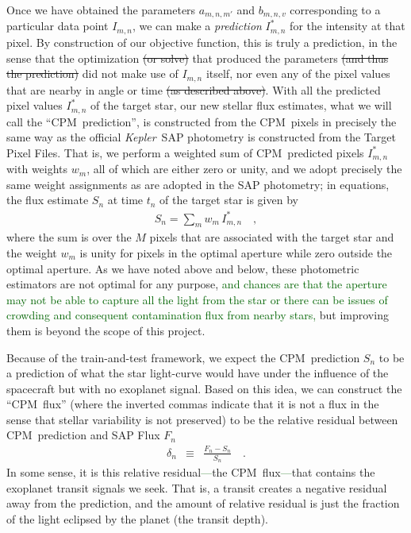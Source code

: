 \documentclass[12pt, preprint]{aastex}
\newcommand{\project}[1]{\textsl{#1}}
\newcommand{\Kepler}{\project{Kepler}}
\newcommand{\name}{CPM}
\newcommand{\revise}[1]{\textcolor{darkgreen}{#1}}
\newcommand{\remove}[1]{\sout{#1}}
\begin{document}
Once we have obtained the parameters $a_{m,n,m'}$ and $b_{m,n,v}$ corresponding to a particular data point $I_{m,n}$,
  we can make a \emph{prediction} $I^{\ast}_{m,n}$ for the intensity at that pixel.
By construction of our objective function, this is truly a prediction,
  in the sense that the optimization \remove{(or solve)} that produced the parameters
  \remove{(and thus the prediction)}
  did not make use of $I_{m,n}$ itself,
  nor even any of the pixel values that are nearby in angle or time
  \remove{(as described above)}.
  With all the predicted pixel values $I^{\ast}_{m,n}$ of the target star,  
  our new stellar flux estimates,
  what we will call the ``\name\ prediction'',
  is constructed from the \name\ pixels
  in precisely the same way as the official \Kepler\ SAP photometry
  is constructed from the Target Pixel Files.
That is, we perform a weighted sum of \name\ predicted pixels $I^{\ast}_{m,n}$ with weights $w_m$,
  all of which are either zero or unity,
  and we adopt precisely the same weight assignments as are adopted in the SAP photometry;
  in equations, the flux estimate $S_n$ at time $t_n$ of the target star is given by
\begin{eqnarray}
S_n = \sum_m w_m\,I^{\ast}_{m,n}
\quad ,
\end{eqnarray}
where the sum is over the $M$ pixels that are associated with the target star and the weight $w_m$ is unity for pixels in the optimal
aperture while zero outside the optimal aperture.
As we have noted above and below, these photometric estimators are not optimal for any purpose, \revise{and chances are that the aperture may not be able to capture all the light from the star or there can be issues of crowding and consequent contamination flux from nearby stars,}
  but improving them is beyond the scope of this project.

Because of the train-and-test framework,  
  we expect the \name\ prediction $S_{n}$ to be a prediction of
  what the star light-curve would have under the influence of the spacecraft but with no exoplanet signal. 
Based on this idea, 
  we can construct the ``\name\ flux'' 
  (where the inverted commas indicate that it is not a flux in the sense that stellar variability is not preserved) 
  to be the relative residual between \name\ prediction and SAP Flux $F_{n}$
\begin{eqnarray}
\delta_{n}&\equiv&\frac{F_{n} - S_{n}}{S_{n}}
\quad .
\end{eqnarray} 
In some sense, it is this relative residual\revise{---}the \name\ flux\revise{---}that contains the exoplanet transit signals we seek. 
That is, a transit creates a negative residual away from the prediction, 
  and the amount of relative residual is just the fraction of the light eclipsed by the planet (the transit depth). 
\end{document}
